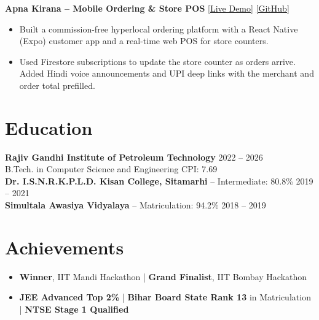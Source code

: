 \documentclass[a4paper,10pt]{article}
\begin{document}
\textbf{Apna Kirana -- Mobile Ordering \& Store POS} \hfill \href{https://apna-kirana-admin.vercel.app/live_demo.html}{[Live Demo]} \quad \href{https://github.com/Mani1454/Online_shop}{[GitHub]}
\begin{itemize}
    \item Built a commission-free hyperlocal ordering platform with a React Native (Expo) customer app and a real-time web POS for store counters.
    \item Used Firestore subscriptions to update the store counter as orders arrive. Added Hindi voice announcements and UPI deep links with the merchant and order total prefilled.
\end{itemize}


\section*{Education}

\textbf{Rajiv Gandhi Institute of Petroleum Technology} \hfill 2022 -- 2026 \\
B.Tech. in Computer Science and Engineering \hfill CPI: 7.69 \\
\textbf{Dr. I.S.N.R.K.P.L.D. Kisan College, Sitamarhi} -- Intermediate: 80.8\% \hfill 2019 -- 2021 \\
\textbf{Simultala Awasiya Vidyalaya} -- Matriculation: 94.2\% \hfill 2018 -- 2019


\section*{Achievements}
\begin{itemize}[itemsep=0.5pt]
    \item \textbf{Winner}, IIT Mandi Hackathon \quad | \quad \textbf{Grand Finalist}, IIT Bombay Hackathon
    \item \textbf{JEE Advanced Top 2\%} \quad | \quad \textbf{Bihar Board State Rank 13} in Matriculation \quad | \quad \textbf{NTSE Stage 1 Qualified}
\end{itemize}
\end{document}
